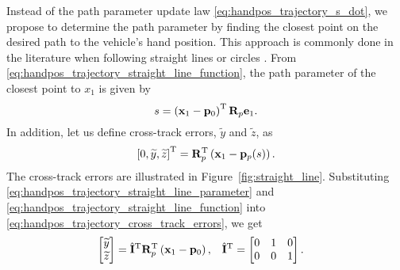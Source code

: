 Instead of the path parameter update law \eqref{eq:handpos_trajectory_s_dot}, we propose to determine the path parameter by finding the closest point on the desired path to the vehicle's hand position.
This approach is commonly done in the literature when following straight lines or circles \cite{breivik_path_following_2004}.
From \eqref{eq:handpos_trajectory_straight_line_function}, the path parameter of the closest point to $x_1$ is given by
\begin{equation}
    s = \left(\mathbf{x}_1 - \mathbf{p}_0\right)^{\mathrm{T}} \mathbf{R}_p \mathbf{e}_1. \label{eq:handpos_trajectory_straight_line_parameter}
\end{equation}
In addition, let us define cross-track errors, $\widetilde{y}$ and $\widetilde{z}$, as
\begin{equation}
    \left[0, \widetilde{y}, \widetilde{z}\right]^{\mathrm{T}} = \mathbf{R}_p^{\mathrm{T}} \left(\mathbf{x}_1 - \mathbf{p}_p(s)\right). \label{eq:handpos_trajectory_cross_track_errors}
\end{equation}
The cross-track errors are illustrated in Figure~\ref{fig:straight_line}.
Substituting \eqref{eq:handpos_trajectory_straight_line_parameter} and \eqref{eq:handpos_trajectory_straight_line_function} into \eqref{eq:handpos_trajectory_cross_track_errors}, we get
\begin{align}
    \begin{bmatrix} \widetilde{y} \\ \widetilde{z} \end{bmatrix} &= \hat{\mathbf{I}}^{\mathrm{T}} \mathbf{R}_p^{\mathrm{T}} \left(\mathbf{x}_1 - \mathbf{p}_0\right), &
    \hat{\mathbf{I}}^{\mathrm{T}} &= \begin{bmatrix} 0 & 1 & 0 \\ 0 & 0 & 1 \end{bmatrix}.
\end{align}

